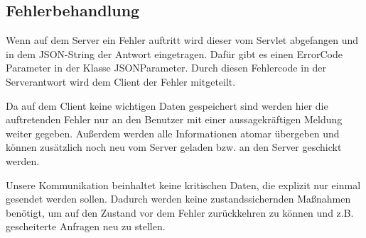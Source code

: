 \begin {center}
\end {center}
\newpage
	\subsection{Fehlerbehandlung}
Wenn auf dem Server ein Fehler auftritt wird dieser vom Servlet abgefangen und in dem JSON-String der Antwort eingetragen. Dafür gibt es einen ErrorCode Parameter in der Klasse JSONParameter. Durch diesen Fehlercode in der Serverantwort wird dem Client der Fehler mitgeteilt.\par

Da auf dem Client keine wichtigen Daten gespeichert sind werden hier die auftretenden Fehler nur an den Benutzer mit einer aussagekräftigen Meldung weiter gegeben. Außerdem werden alle Informationen atomar übergeben und können zusätzlich noch neu vom Server geladen bzw. an den Server geschickt werden. \par

Unsere Kommunikation beinhaltet keine kritischen Daten, die explizit nur einmal gesendet werden sollen. Dadurch werden keine zustandssichernden Maßnahmen benötigt, um auf den Zustand vor dem Fehler zurückkehren zu können und z.B. gescheiterte Anfragen neu zu stellen.

	\newpage
